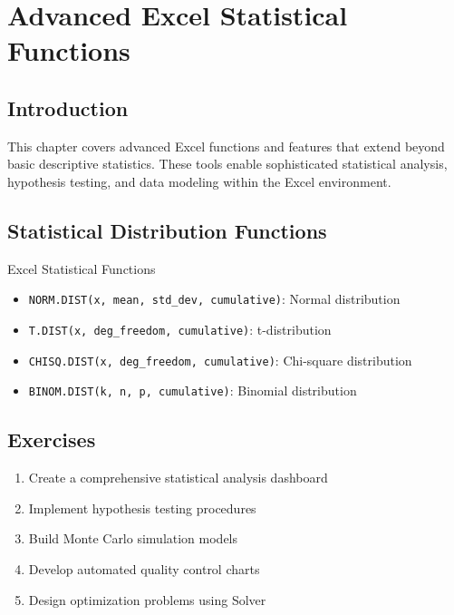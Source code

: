 \documentclass[12pt,a4paper]{book}
\begin{document}
\chapter{Advanced Excel Statistical Functions}

\section{Introduction}

This chapter covers advanced Excel functions and features that extend beyond basic descriptive statistics. These tools enable sophisticated statistical analysis, hypothesis testing, and data modeling within the Excel environment.

\section{Statistical Distribution Functions}

\begin{example}{Excel Statistical Functions}
\begin{itemize}
    \item \texttt{NORM.DIST(x, mean, std\_dev, cumulative)}: Normal distribution
    \item \texttt{T.DIST(x, deg\_freedom, cumulative)}: t-distribution
    \item \texttt{CHISQ.DIST(x, deg\_freedom, cumulative)}: Chi-square distribution
    \item \texttt{BINOM.DIST(k, n, p, cumulative)}: Binomial distribution
\end{itemize}
\end{example}

\section{Exercises}

\begin{enumerate}
    \item Create a comprehensive statistical analysis dashboard
    \item Implement hypothesis testing procedures
    \item Build Monte Carlo simulation models
    \item Develop automated quality control charts
    \item Design optimization problems using Solver
\end{enumerate}

\end{document}
